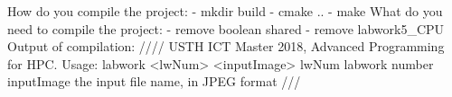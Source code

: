 How do you compile the project:
	- mkdir build
	- cmake ..
	- make
What do you need to compile the project:
	- remove boolean shared
	- remove labwork5_CPU
Output of compilation:
////
USTH ICT Master 2018, Advanced Programming for HPC.
Usage: labwork <lwNum> <inputImage>
   lwNum        labwork number
   inputImage   the input file name, in JPEG format
///
